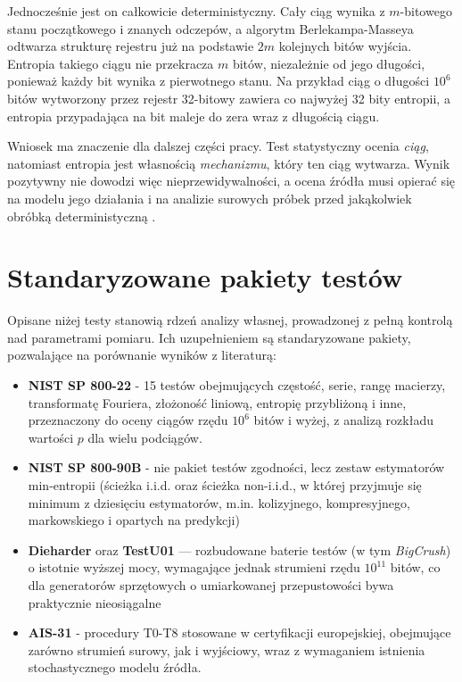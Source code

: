 Jednocześnie jest on całkowicie deterministyczny. Cały ciąg wynika
z $m$-bitowego stanu początkowego i znanych odczepów, a algorytm
Berlekampa-Masseya \cite{massey1969shift} odtwarza strukturę rejestru już
na podstawie $2m$ kolejnych bitów wyjścia. Entropia takiego ciągu nie
przekracza $m$ bitów, niezależnie od jego długości, ponieważ każdy bit
wynika z pierwotnego stanu. Na przykład ciąg o długości $10^6$ bitów
wytworzony przez rejestr 32-bitowy zawiera co najwyżej 32 bity entropii,
a entropia przypadająca na bit maleje do zera wraz z długością ciągu.

Wniosek ma znaczenie dla dalszej części pracy. Test statystyczny ocenia
\emph{ciąg}, natomiast entropia jest własnością \emph{mechanizmu}, który
ten ciąg wytwarza. Wynik pozytywny nie dowodzi więc nieprzewidywalności,
a ocena źródła musi opierać się na modelu jego działania i na analizie
surowych próbek przed jakąkolwiek obróbką deterministyczną
\cite{turan2018sp80090b}.

\section{Standaryzowane pakiety testów}

Opisane niżej testy stanowią rdzeń analizy własnej, prowadzonej z pełną
kontrolą nad parametrami pomiaru. Ich uzupełnieniem są standaryzowane
pakiety, pozwalające na porównanie wyników z literaturą:

\begin{itemize}
  \item \textbf{NIST SP 800-22} \cite{rukhin2010sp80022} - 15 testów
        obejmujących częstość, serie, rangę macierzy, transformatę Fouriera,
        złożoność liniową, entropię przybliżoną i inne, przeznaczony do
        oceny ciągów rzędu $10^6$ bitów i wyżej, z analizą rozkładu
        wartości $p$ dla wielu podciągów.
  \item \textbf{NIST SP 800-90B} \cite{turan2018sp80090b} - nie pakiet
        testów zgodności, lecz zestaw estymatorów min-entropii (ścieżka
        i.i.d. oraz ścieżka non-i.i.d., w której przyjmuje się minimum
        z dziesięciu estymatorów, m.in. kolizyjnego, kompresyjnego,
        markowskiego i opartych na predykcji)
  \item \textbf{Dieharder} oraz \textbf{TestU01} \cite{lecuyer2007testu01}
        --- rozbudowane baterie testów (w tym \emph{BigCrush}) o istotnie
        wyższej mocy, wymagające jednak strumieni rzędu $10^{11}$ bitów,
        co dla generatorów sprzętowych o umiarkowanej przepustowości bywa
        praktycznie nieosiągalne
  \item \textbf{AIS-31} \cite{killmann2011ais31} - procedury T0-T8
        stosowane w certyfikacji europejskiej, obejmujące zarówno strumień
        surowy, jak i wyjściowy, wraz z wymaganiem istnienia
        stochastycznego modelu źródła.
\end{itemize}

